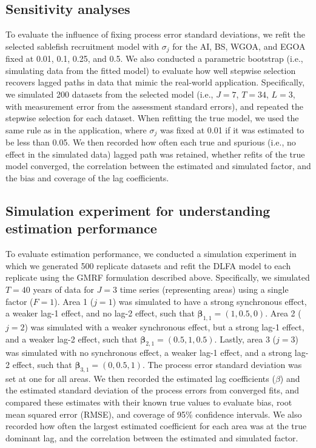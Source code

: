\documentclass[12pt]{article}
\begin{document}
\subsection{Sensitivity analyses}
To evaluate the influence of fixing process error standard deviations,
we refit the selected sablefish recruitment model with $\sigma_j$ for
the AI, BS, WGOA, and EGOA fixed at 0.01, 0.1, 0.25, and 0.5. We also
conducted a parametric bootstrap (i.e., simulating data from the fitted
model) to evaluate how well stepwise selection recovers lagged paths in
data that mimic the real-world application. Specifically, we simulated
200 datasets from the selected model (i.e., $J = 7$, $T = 34$, $L = 3$,
with measurement error from the assessment standard errors), and
repeated the stepwise selection for each dataset. When refitting the
true model, we used the same rule as in the application, where
$\sigma_j$ was fixed at 0.01 if it was estimated to be less than 0.05.
We then recorded how often each true and spurious (i.e., no effect in
the simulated data) lagged path was retained, whether refits of the true
model converged, the correlation between the estimated and simulated
factor, and the bias and coverage of the lag coefficients.

\subsection{Simulation experiment for understanding estimation performance}
To evaluate estimation performance, we conducted a simulation experiment
in which we generated 500 replicate datasets and refit the DLFA model to
each replicate using the GMRF formulation described above. Specifically, we
simulated $T=40$ years of data for $J=3$ time series (representing
areas) using a single factor ($F=1$). Area 1 ($j=1$) was simulated to
have a strong synchronous effect, a weaker lag-1 effect, and no lag-2
effect, such that $\boldsymbol\beta_{1,1} = (1, 0.5, 0)$. Area 2 ($j=2$) was
simulated with a weaker synchronous effect, but a strong lag-1 effect,
and a weaker lag-2 effect, such that $\boldsymbol\beta_{2,1} = (0.5, 1, 0.5)$.
Lastly, area 3 ($j=3$) was simulated with no synchronous effect, a
weaker lag-1 effect, and a strong lag-2 effect, such that $\boldsymbol\beta_{3,1}
= (0, 0.5, 1)$. The process error standard deviation was set at one for
all areas. We then recorded the estimated lag coefficients ($\beta$)
and the estimated standard deviation of the process errors from converged fits, and
compared these estimates with their known true values to evaluate bias,
root mean squared error (RMSE), and coverage of 95\% confidence
intervals. We also recorded how often the largest estimated coefficient
for each area was at the true dominant lag, and the correlation between
the estimated and simulated factor.
\end{document}
